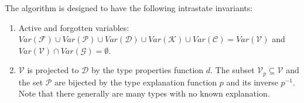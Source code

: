 \begin{defn}
    The algorithm is designed to have the following intrastate invariants:


    \begin{enumerate}
        \item Active and forgotten variables: $Var(\mathcal{F}) \cup Var(\mathcal{P}) \cup Var(\mathcal{D}) \cup Var(\mathcal{K}) \cup Var(\mathcal{C}) = Var(\mathcal{V})$ and $Var(\mathcal{V}) \cap Var(\mathcal{G}) = \emptyset$. \label{invVar}

        \item $\mathcal{V}$ is projected to $\mathcal{D}$  by the type properties function $d$. The subset $\mathcal{V}_p \subseteq \mathcal{V}$ and the set $\mathcal{P}$ are bijected by the type explanation function $p$ and its inverse $p^{-1}$. Note that there generally are many types with no known explanation. \label{invPD}


\end{enumerate}
\end{defn}
